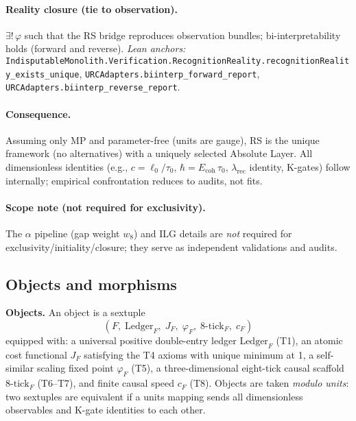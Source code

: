 \documentclass[11pt]{article}
\begin{document}
\paragraph{Reality closure (tie to observation).} \(\exists !\,\varphi\) such that the RS bridge reproduces observation bundles; bi\mbox{-}interpretability holds (forward and reverse). \emph{Lean anchors:} \texttt{IndisputableMonolith.Verification.RecognitionReality.recognitionReality\_exists\_unique}, \texttt{URCAdapters.biinterp\_forward\_report}, \texttt{URCAdapters.biinterp\_reverse\_report}.

\paragraph{Consequence.} Assuming only MP and parameter\mbox{-}free (units are gauge), RS is the unique framework (no alternatives) with a uniquely selected Absolute Layer. All dimensionless identities (e.g., \(c=\ell_0/\tau_0\), \(\hbar=E_{\mathrm{coh}}\,\tau_0\), \(\lambda_{\mathrm{rec}}\) identity, K\mbox{-}gates) follow internally; empirical confrontation reduces to audits, not fits.

\paragraph{Scope note (not required for exclusivity).} The \(\alpha\) pipeline (gap weight \(w_8\)) and ILG details are \emph{not} required for exclusivity/initiality/closure; they serve as independent validations and audits.

\subsection{Objects and morphisms}
\textbf{Objects.} An object is a sextuple
\[
  (F,\; \mathrm{Ledger}_F,\; J_F,\; \varphi_F,\; 8\mbox{-}\mathrm{tick}_F,\; c_F)
\]
equipped with: a universal positive double\mbox{-}entry ledger \(\mathrm{Ledger}_F\) (T1), an atomic cost functional \(J_F\) satisfying the T4 axioms with unique minimum at 1, a self\mbox{-}similar scaling fixed point \(\varphi_F\) (T5), a three\mbox{-}dimensional eight\mbox{-}tick causal scaffold \(8\mbox{-}\mathrm{tick}_F\) (T6--T7), and finite causal speed \(c_F\) (T8). Objects are taken \emph{modulo units}: two sextuples are equivalent if a units mapping sends all dimensionless observables and K\mbox{-}gate identities to each other.
\end{document}
